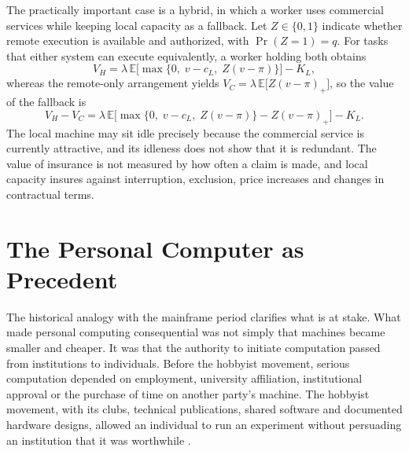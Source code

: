 \documentclass[11pt]{article}
\theoremstyle{plain}
\theoremstyle{definition}
\begin{document}
The practically important case is a hybrid, in which a worker uses commercial services while keeping local capacity as a fallback. Let $Z\in\{0,1\}$ indicate whether remote execution is available and authorized, with $\Pr(Z=1)=q$. For tasks that either system can execute equivalently, a worker holding both obtains
\[
V_H=\lambda\,\mathbb{E}\bigl[\max\{0,\;v-c_L,\;Z(v-\pi)\}\bigr]-K_L,
\]
whereas the remote-only arrangement yields $V_C=\lambda\,\mathbb{E}\bigl[Z(v-\pi)_+\bigr]$, so the value of the fallback is
\[
V_H-V_C=\lambda\,\mathbb{E}\bigl[\max\{0,\;v-c_L,\;Z(v-\pi)\}-Z(v-\pi)_+\bigr]-K_L.
\]
The local machine may sit idle precisely because the commercial service is currently attractive, and its idleness does not show that it is redundant. The value of insurance is not measured by how often a claim is made, and local capacity insures against interruption, exclusion, price increases and changes in contractual terms.

\section{The Personal Computer as Precedent}

The historical analogy with the mainframe period clarifies what is at stake. What made personal computing consequential was not simply that machines became smaller and cheaper. It was that the authority to initiate computation passed from institutions to individuals. Before the hobbyist movement, serious computation depended on employment, university affiliation, institutional approval or the purchase of time on another party's machine. The hobbyist movement, with its clubs, technical publications, shared software and documented hardware designs, allowed an individual to run an experiment without persuading an institution that it was worthwhile \cite{levy,turner}.
\end{document}
